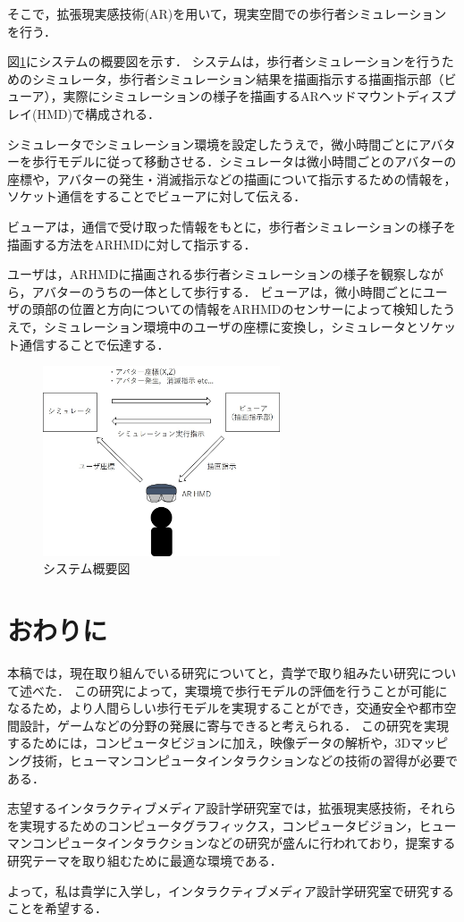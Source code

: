 \documentclass[twocolumn]{jarticle}%
\begin{document}
そこで，拡張現実感技術(AR)を用いて，現実空間での歩行者シミュレーションを行う．

図\ref{fig:systemImage}にシステムの概要図を示す．
システムは，歩行者シミュレーションを行うためのシミュレータ，歩行者シミュレーション結果を描画指示する描画指示部（ビューア），実際にシミュレーションの様子を描画するARヘッドマウントディスプレイ(HMD)で構成される．

シミュレータでシミュレーション環境を設定したうえで，微小時間ごとにアバターを歩行モデルに従って移動させる．シミュレータは微小時間ごとのアバターの座標や，アバターの発生・消滅指示などの描画について指示するための情報を，ソケット通信をすることでビューアに対して伝える．

ビューアは，通信で受け取った情報をもとに，歩行者シミュレーションの様子を描画する方法をARHMDに対して指示する．

ユーザは，ARHMDに描画される歩行者シミュレーションの様子を観察しながら，アバターのうちの一体として歩行する．
ビューアは，微小時間ごとにユーザの頭部の位置と方向についての情報をARHMDのセンサーによって検知したうえで，シミュレーション環境中のユーザの座標に変換し，シミュレータとソケット通信することで伝達する．

\begin{figure}[htbp]
  \begin{center}
    \includegraphics[width=70mm]{images/systemImage.jpg}
  \end{center}
    \caption{システム概要図}
    \label{fig:systemImage}
\end{figure}

\vspace{-2mm}
\section{おわりに}
本稿では，現在取り組んでいる研究についてと，貴学で取り組みたい研究について述べた．
この研究によって，実環境で歩行モデルの評価を行うことが可能になるため，より人間らしい歩行モデルを実現することができ，交通安全や都市空間設計，ゲームなどの分野の発展に寄与できると考えられる．
この研究を実現するためには，コンピュータビジョンに加え，映像データの解析や，3Dマッピング技術，ヒューマンコンピュータインタラクションなどの技術の習得が必要である．

志望するインタラクティブメディア設計学研究室では，拡張現実感技術，それらを実現するためのコンピュータグラフィックス，コンピュータビジョン，ヒューマンコンピュータインタラクションなどの研究が盛んに行われており，提案する研究テーマを取り組むために最適な環境である．

よって，私は貴学に入学し，インタラクティブメディア設計学研究室で研究することを希望する．

\vspace{-2mm}




\end{document}
